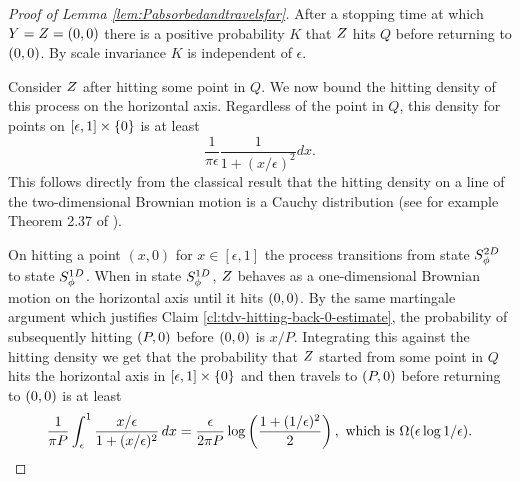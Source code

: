 {\begin{proof}[Proof of Lemma \ref{lem:Pabsorbedandtravelsfar}]
After a stopping time at which $Y = Z = (0,0)$ there is a positive probability $K$
that $Z$ hits $Q$ before returning to $(0,0)$.
By scale invariance $K$ is independent of $\epsilon$.

Consider $Z$ after hitting some point in $Q$.  We now
bound the hitting density of this process on the horizontal
axis.  Regardless of the point in $Q$, this density for points on
$[\epsilon,1] \times \{0\}$ is at least
\[
\frac{1}{\pi\epsilon} \frac{1}{1 + (x/\epsilon)^2} dx.
\]
This follows directly from the classical result that the hitting density
on a line of the two-dimensional Brownian motion is a Cauchy distribution
(see for example Theorem 2.37 of \cite{mortens-peres}).

On hitting a point $(x,0)$ for $x \in [\epsilon, 1]$ the process
transitions from state $S^{2D}_{\phi}$ to state $S^{1D}_{\phi}$.
When in state $S^{1D}_{\phi}$, $Z$ behaves as a
one-dimensional Brownian motion on the horizontal axis until it hits
$(0,0)$.
By the same martingale argument which justifies
Claim \ref{cl:tdv-hitting-back-0-estimate}, the
probability of subsequently hitting $(P,0)$ before $(0,0)$ is $x/P$.
Integrating this against the hitting density we get that the probability that
$Z$ started from some point in $Q$ hits the horizontal axis in $[\epsilon,1] \times \{0\}$
and then travels to $(P,0)$ before returning
to $(0,0)$ is at least
\[
\frac{1}{\pi P} \int_{\epsilon}^{1} \frac{x/\epsilon}{1 + (x/\epsilon)^2}
\, dx
=
\frac{\epsilon}{2\pi P} \log\left(\frac{1 + (1/\epsilon)^2}{2}\right)
,\text{ which is }
\Omega(\epsilon\log 1/\epsilon).
\]
\end{proof}
}
